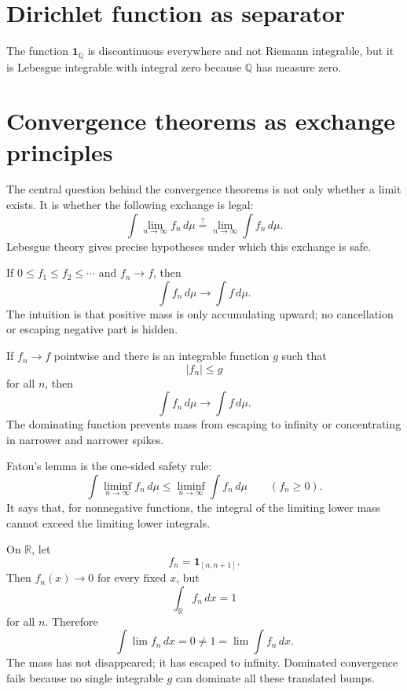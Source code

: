 \section{Dirichlet function as separator}
The function \(\mathbf 1_{\mathbb Q}\) is discontinuous everywhere and not Riemann integrable, but it is Lebesgue integrable with integral zero because \(\mathbb Q\) has measure zero.
\section{Convergence theorems as exchange principles}

The central question behind the convergence theorems is not only whether a limit exists.  It is whether the following exchange is legal:
\[
  \int \lim_{n\to\infty} f_n\,d\mu
  \stackrel{?}{=}
  \lim_{n\to\infty}\int f_n\,d\mu.
\]
Lebesgue theory gives precise hypotheses under which this exchange is safe.

\begin{theorem}
If \(0\le f_1\le f_2\le\cdots\) and \(f_n\to f\), then
\[
  \int f_n\,d\mu\longrightarrow \int f\,d\mu.
\]
The intuition is that positive mass is only accumulating upward; no cancellation or escaping negative part is hidden.
\end{theorem}

\begin{theorem}
If \(f_n\to f\) pointwise and there is an integrable function \(g\) such that
\[
  |f_n|\le g
\]
for all \(n\), then
\[
  \int f_n\,d\mu\longrightarrow \int f\,d\mu.
\]
The dominating function prevents mass from escaping to infinity or concentrating in narrower and narrower spikes.
\end{theorem}

Fatou's lemma is the one-sided safety rule:
\[
  \int \liminf_{n\to\infty} f_n\,d\mu
  \le
  \liminf_{n\to\infty}\int f_n\,d\mu
  \qquad (f_n\ge0).
\]
It says that, for nonnegative functions, the integral of the limiting lower mass cannot exceed the limiting lower integrals.

\begin{example}
On \(\mathbb R\), let
\[
  f_n=\mathbf 1_{[n,n+1]}.
\]
Then \(f_n(x)\to0\) for every fixed \(x\), but
\[
  \int_{\mathbb R} f_n\,dx=1
\]
for all \(n\).  Therefore
\[
  \int \lim f_n\,dx=0
  \ne
  1=\lim \int f_n\,dx.
\]
The mass has not disappeared; it has escaped to infinity.  Dominated convergence fails because no single integrable \(g\) can dominate all these translated bumps.
\end{example}

